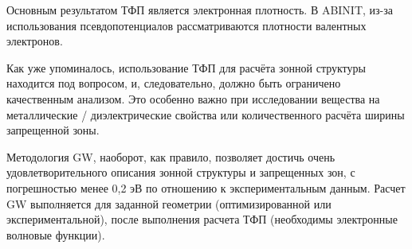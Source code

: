 Основным результатом ТФП является электронная плотность. В ABINIT, из-за использования псевдопотенциалов рассматриваются плотности валентных электронов. 

Как уже упоминалось, использование ТФП для расчёта зонной структуры находится под вопросом, и, следовательно, должно быть ограничено качественным анализом. Это особенно важно при исследовании вещества на металлические / диэлектрические свойства или количественного расчёта ширины запрещенной зоны.

Методология GW, наоборот, как правило, позволяет достичь очень удовлетворительного описания зонной структуры и запрещенных зон, с погрешностью менее 0,2 эВ по отношению к экспериментальным данным. Расчет GW выполняется для заданной геометрии (оптимизированной или экспериментальной), после выполнения расчета ТФП (необходимы электронные волновые функции).

